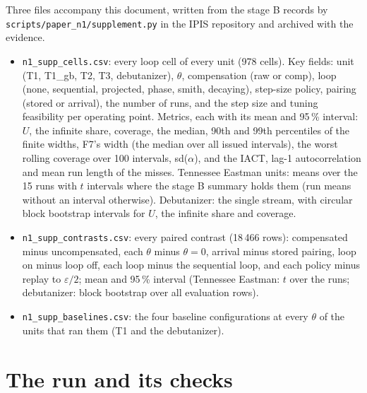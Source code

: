 \documentclass[10pt,a4paper]{article}
\begin{document}
Three files accompany this document, written from the stage B records by
\texttt{scripts/paper\_n1/supplement.py} in the IPIS repository and archived with the evidence.
\begin{itemize}\setlength{\itemsep}{0pt}
\item \texttt{n1\_supp\_cells.csv}: every loop cell of every unit (978 cells). Key fields: unit
(T1, T1\_gb, T2, T3, debutanizer), $\theta$, compensation (raw or comp), loop (none, sequential,
projected, phase, smith, decaying), step-size policy, pairing (stored or arrival), the number of
runs, and the step size and tuning feasibility per operating point. Metrics, each with its mean
and 95\,\% interval: $U$, the infinite share, coverage, the median, 90th and 99th percentiles of
the finite widths, F7's width (the median over all issued intervals), the worst rolling coverage
over 100 intervals, sd($\alpha$), and the IACT, lag-1 autocorrelation and mean run length of the
misses. Tennessee Eastman units: means over the 15 runs with $t$ intervals where the stage B
summary holds them (run means without an interval otherwise). Debutanizer: the single stream,
with circular block bootstrap intervals for $U$, the infinite share and coverage.
\item \texttt{n1\_supp\_contrasts.csv}: every paired contrast (18\,466 rows): compensated minus
uncompensated, each $\theta$ minus $\theta = 0$, arrival minus stored pairing, loop on minus loop
off, each loop minus the sequential loop, and each policy minus replay to $\varepsilon/2$; mean and
95\,\% interval (Tennessee Eastman: $t$ over the runs; debutanizer: block bootstrap over all
evaluation rows).
\item \texttt{n1\_supp\_baselines.csv}: the four baseline configurations at every $\theta$ of the
units that ran them (T1 and the debutanizer).
\end{itemize}

\section{The run and its checks}\label{sec:run}
\end{document}
